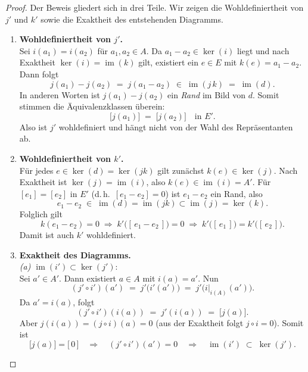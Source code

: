 \documentclass[12pt, hidelinks]{article}
\numberwithin{conj}{section}
\newcommand{\ima}{\operatorname{im}}
\begin{document}
\begin{proof}
    Der Beweis gliedert sich in drei Teile. Wir zeigen die Wohldefiniertheit von $j'$ und $k'$ sowie die Exaktheit des entstehenden Diagramms.
    
    \begin{enumerate}[nolistsep]
        \item \textbf{Wohldefiniertheit von $j'$.} \\
              Sei $i(a_1) = i(a_2)$ für $a_1, a_2 \in A$. Da $a_1 - a_2 \in \ker(i)$ liegt und nach Exaktheit $\ker(i) = \ima(k)$ gilt, existiert ein $e \in E$ mit $k(e) = a_1 - a_2$. Dann folgt
              \[
                j(a_1) - j(a_2) \;=\; j(a_1 - a_2)
                \;\in\; \ima(j\,k) \;=\; \ima(d).
              \]
              In anderen Worten ist $j(a_1) - j(a_2)$ ein \emph{Rand} im Bild von $d$. Somit stimmen die Äquivalenzklassen überein:
              \[
                \bigl[j(a_1)\bigr]
                \;=\;
                \bigl[j(a_2)\bigr]
                \quad\text{in } E'.
              \]
              Also ist $j'$ wohldefiniert und hängt nicht von der Wahl des Repräsentanten ab.
              
        \item \textbf{Wohldefiniertheit von $k'$.} \\
              Für jedes $e \in \ker(d) = \ker(jk)$ gilt zunächst $k(e) \in \ker(j)$. Nach Exaktheit ist $\ker(j) = \ima(i)$, also $k(e) \in \ima(i) = A'$. Für $[e_1] = [e_2]$ in $E'$ (d.\,h.\ $[e_1 - e_2] = 0$) ist $e_1 - e_2$ ein Rand, also
              \[
                e_1 - e_2 \;\in\; \ima(d) = \ima(jk) \subset \ima(j) = \ker(k).
              \]
              Folglich gilt
              \[
                k(e_1 - e_2) = 0
                \;\Longrightarrow\;
                k'\bigl([\,e_1 - e_2\,]\bigr) = 0
                \;\Longrightarrow\;
                k'\bigl([\,e_1\,]\bigr) = k'\bigl([\,e_2\,]\bigr).
              \]
              Damit ist auch $k'$ wohldefiniert.
              
        \item \textbf{Exaktheit des Diagramms.} \\
              \emph{(a) $\ima(i') \subset \ker(j')$}:\\
              Sei $a' \in A'$. Dann existiert $a \in A$ mit $i(a) = a'$. Nun
              \[
                (j' \circ i')(a')
                \;=\;
                j'\bigl(i'(a')\bigr)
                \;=\;
                j'\bigl(i\vert_{i(A)}(a')\bigr).
              \]
              Da $a' = i(a)$, folgt
              \[
                (j' \circ i')(i(a))
                \;=\; j'(i(a))
                \;=\; \bigl[j(a)\bigr].
              \]
              Aber $j(i(a)) = (j \circ i)(a) = 0$ (aus der Exaktheit folgt $j \circ i = 0$). Somit ist
              \[
                \bigl[j(a)\bigr] = \bigl[\,0\,\bigr]
                \quad\Longrightarrow\quad
                (j' \circ i')(a') = 0
                \quad\Longrightarrow\quad
                \ima(i') \;\subset\; \ker(j').
              \]
              

\end{enumerate}
\end{proof}
\end{document}
